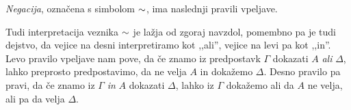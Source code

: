 \begin{definicija}
    \emph{Negacija}, označena s simbolom $\negacija$, ima naslednji pravili vpeljave.
    \begin{center}
        \begin{bprooftree}
        \end{bprooftree}
        \begin{bprooftree}
        \end{bprooftree}
    \end{center}
    Tudi interpretacija veznika $\negacija$ je lažja od zgoraj navzdol, pomembno pa je tudi dejstvo, da vejice na desni interpretiramo kot ,,ali'', vejice na levi pa kot ,,in''. Levo pravilo vpeljave nam pove, da če znamo iz predpostavk $\Gamma$ dokazati $A$ \emph{ali} $\Delta$, lahko preprosto predpostavimo, da ne velja $A$ in dokažemo $\Delta$. Desno pravilo pa pravi, da če znamo iz $\Gamma$ \emph{in} $A$ dokazati $\Delta$, lahko iz $\Gamma$ dokažemo ali da $A$ ne velja, ali pa da velja $\Delta$.
\end{definicija}

